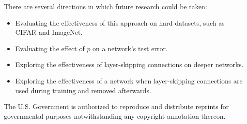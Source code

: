 \documentclass[utf8]{frontiersSCNS}
\begin{document}
There are several directions in which future research could be taken:
\begin{itemize} 
\item Evaluating the effectiveness of this approach on hard datasets, such as CIFAR and ImageNet.
\item Evaluating the effect of $p$ on a network's test error.
\item Exploring the effectiveness of layer-skipping connections on deeper networks.
\item Exploring the effectiveness of a network when layer-skipping connections are used during training and removed afterwards.
\end{itemize}




The U.S. Government is authorized to reproduce and distribute reprints for governmental purposes notwithstanding any copyright annotation thereon.



\end{document}
